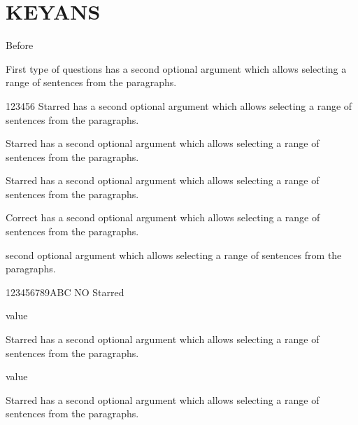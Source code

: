 \documentclass{article}
\begin{document}
\newpage

\section{KEYANS}



Before

\begin{enumext}[nosep,align=center,save-ans=mytest,show-ans,check-ans=true,save-ref,widest=99,]
\item* First type of questions %
has a second optional argument
which allows selecting a range of sentences from the paragraphs.

\begin{keyans}[itemindent=1.5cm,columns=2,columns-sep=1cm]
  \item[123456] Starred has a second optional argument
which allows selecting a range of sentences from the paragraphs.
  \item Starred has a second optional argument
which allows selecting a range of sentences from the paragraphs.
  \item Starred has a second optional argument
which allows selecting a range of sentences from the paragraphs.
  \item*[X] Correct has a second optional argument
which allows selecting a range of sentences from the paragraphs.
\end{keyans}

\item second optional argument
which allows selecting a range of sentences from the paragraphs.

\begin{keyans}[itemindent=0.5cm,columns=2]
  \item[123456789ABC] NO Starred
  \item value
  \item*[Z]  Starred has a second optional argument
which allows selecting a range of sentences from the paragraphs.
  \item value
  \item Starred has a second optional argument
which allows selecting a range of sentences from the paragraphs.
\end{keyans}



\end{enumext}
\end{document}
